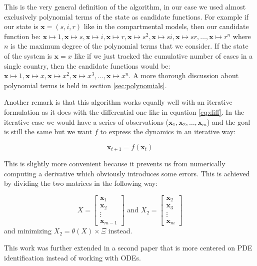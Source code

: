 \documentclass[12pt, letterpaper]{article}
\begin{document}
This is the very general definition of the algorithm, in our case we used almost exclusively polynomial terms of the state as candidate functions. 
For example if our state is $\mathbf{x} = (s, i, r)$ like in the compartmental models, then our candidate function be: 
$\mathbf{x} \mapsto 1,
\mathbf{x} \mapsto s,
\mathbf{x} \mapsto i,
\mathbf{x} \mapsto r,
\mathbf{x} \mapsto s^2,
\mathbf{x} \mapsto si,
\mathbf{x} \mapsto sr,
\dots,
\mathbf{x} \mapsto r^n$ where $n$ is the maximum degree of the polynomial terms that we consider. 
If the state of the system is $\mathbf{x} = x$ like if we just tracked the cumulative number of cases in a single country, then the candidate functions would be: $\mathbf{x} \mapsto 1,
\mathbf{x} \mapsto x,
\mathbf{x} \mapsto x^2,
\mathbf{x} \mapsto x^3,
\dots,
\mathbf{x} \mapsto x^n$. 
A more thorough discussion about polynomial terms is held in section \ref{sec:polynomials}.

Another remark is that this algorithm works equally well with an iterative formulation as it does with the differential one like in equation \ref{eq:diff}.
In the iterative case we would have a series of observations ($\mathbf{x}_1, \mathbf{x}_2, \dots, \mathbf{x}_m$) and the goal is still the same but we want $f$ to express the dynamics in an iterative way:

\begin{equation}\label{eq:it}
\mathbf{x}_{t+1} = f(\mathbf{x}_t)
\end{equation}

This is slightly more convenient because it prevents us from numerically computing a derivative which obviously introduces some errors. This is achieved by dividing the two matrices in the following way:


$$X = 
\begin{bmatrix}
\mathbf{x}_1 \\
\mathbf{x}_2 \\
\vdots \\
\mathbf{x}_{m-1}
\end{bmatrix}
\text{ and }
X_2 =
\begin{bmatrix}
\mathbf{x}_2 \\
\mathbf{x}_3 \\
\vdots \\
\mathbf{x}_m
\end{bmatrix}
$$
and minimizing $X_2 = \theta(X) \times \Xi$ instead.


This work was further extended in a second paper \cite{sindypde} that is more centered on PDE identification instead of working with ODEs. 
\end{document}

